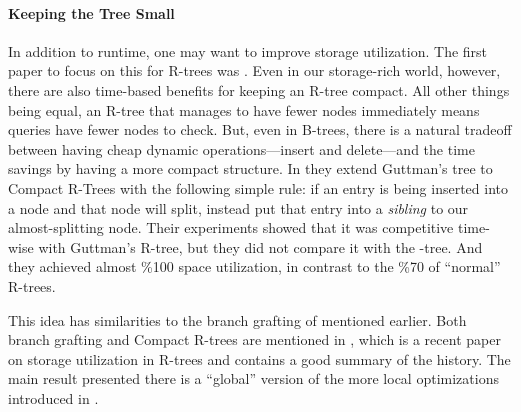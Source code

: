 \paragraph{Keeping the Tree Small}
In addition to runtime, one may want to improve storage utilization.
The first paper to focus on this for R-trees was \cite{huanglinlin01}.
Even in our storage-rich world, however, there are also time-based benefits for keeping an R-tree compact.
All other things being equal, an R-tree that manages to have fewer nodes immediately means queries have fewer nodes to check.
But, even in B-trees, there is a natural tradeoff between having cheap dynamic operations---insert and delete---and the time savings by having a more compact structure.
In \cite{huanglinlin01} they extend Guttman's tree to Compact R-Trees with the following simple rule: if an entry is being inserted into a node and that node will split, instead put that entry into a \emph{sibling} to our almost-splitting node.
Their experiments showed that it was competitive time-wise with Guttman's R-tree, but they did not compare it with the \rstar-tree.
And they achieved almost \%100 space utilization, in contrast to the \%70 of ``normal'' R-trees.

This idea has similarities to the branch grafting of \cite{schrekchen00} mentioned earlier.
Both branch grafting and Compact R-trees are mentioned in \cite{zhanglucheng06}, which is a recent paper on storage utilization in R-trees and contains a good summary of the history.
The main result presented there is a ``global'' version of the more local optimizations introduced in \cite{huanglinlin01}.
